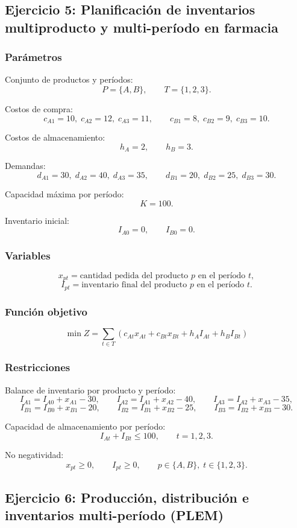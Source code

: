 \documentclass[12pt,a4paper]{article}
\begin{document}
\subsection{Ejercicio 5: Planificación de inventarios multiproducto y multi-período en farmacia}

\subsubsection*{Parámetros}
Conjunto de productos y períodos:
\[
P=\{A,B\},\qquad T=\{1,2,3\}.
\]

Costos de compra:
\[
c_{A1}=10,\; c_{A2}=12,\; c_{A3}=11,\qquad c_{B1}=8,\; c_{B2}=9,\; c_{B3}=10.
\]

Costos de almacenamiento:
\[
h_A=2,\qquad h_B=3.
\]

Demandas:
\[
d_{A1}=30,\; d_{A2}=40,\; d_{A3}=35,\qquad d_{B1}=20,\; d_{B2}=25,\; d_{B3}=30.
\]

Capacidad máxima por período:
\[
K=100.
\]

Inventario inicial:
\[
I_{A0}=0,\qquad I_{B0}=0.
\]

\subsubsection*{Variables}
\[
x_{pt}=\text{cantidad pedida del producto } p \text{ en el período } t,
\]
\[
I_{pt}=\text{inventario final del producto } p \text{ en el período } t.
\]

\subsubsection*{Función objetivo}
\[
\min Z=\sum_{t\in T}\left(c_{At}x_{At}+c_{Bt}x_{Bt}+h_AI_{At}+h_BI_{Bt}\right)
\]

\subsubsection*{Restricciones}
Balance de inventario por producto y período:
\[
I_{A1}=I_{A0}+x_{A1}-30,\qquad
I_{A2}=I_{A1}+x_{A2}-40,\qquad
I_{A3}=I_{A2}+x_{A3}-35,
\]
\[
I_{B1}=I_{B0}+x_{B1}-20,\qquad
I_{B2}=I_{B1}+x_{B2}-25,\qquad
I_{B3}=I_{B2}+x_{B3}-30.
\]

Capacidad de almacenamiento por período:
\[
I_{At}+I_{Bt}\le 100,\qquad t=1,2,3.
\]

No negatividad:
\[
x_{pt}\ge 0,\qquad I_{pt}\ge 0,\qquad p\in\{A,B\},\; t\in\{1,2,3\}.
\]

\subsection{Ejercicio 6: Producción, distribución e inventarios multi-período (PLEM)}
\end{document}
